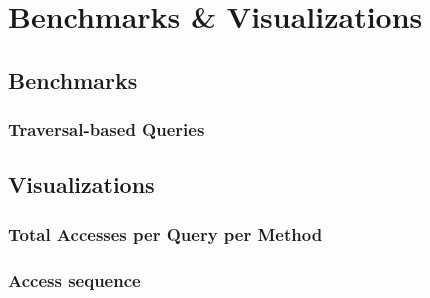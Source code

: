 \section{Benchmarks \& Visualizations}

 \subsection{Benchmarks}
    \subsubsection{Traversal-based Queries}
 
 \subsection{Visualizations}
    \subsubsection{Total Accesses per Query per Method}
    
    \subsubsection{Access sequence}
 
 
